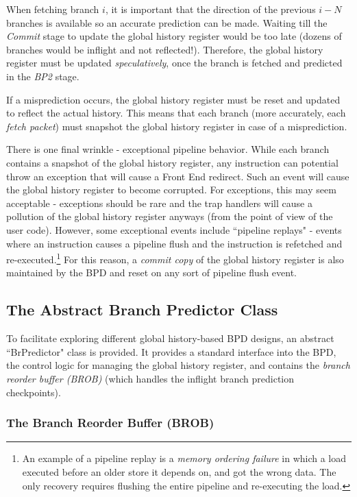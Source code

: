 When fetching branch $i$, it is important that the direction of the previous $i-N$ branches is available so an accurate prediction can be made.  Waiting till the {\em Commit} stage to update the global history register would be too late (dozens of branches would be inflight and not reflected!). Therefore, the global history register must be updated {\em speculatively}, once the branch is fetched and predicted in the {\em BP2} stage.

If a misprediction occurs, the global history register must be reset and updated to reflect the actual history.  This means that each branch (more accurately, each {\em fetch packet}) must snapshot the global history register in case of a misprediction.

There is one final wrinkle - exceptional pipeline behavior.  While each branch contains a snapshot of the global history register, any instruction can potential throw an exception that will cause a Front End redirect. Such an event will cause the global history register to become corrupted. For exceptions, this may seem acceptable - exceptions should be rare and the trap handlers will cause a pollution of the global history register anyways (from the point of view of the user code).  However, some exceptional events include ``pipeline replays" - events where an instruction causes a pipeline flush and the instruction is refetched and re-executed.\footnote{An example of a pipeline replay is a {\em memory ordering failure} in which a load executed before an older store it depends on, and got the wrong data. The only recovery requires flushing the entire pipeline and re-executing the load.}  For this reason, a {\em commit copy} of the global history register is also maintained by the BPD and reset on any sort of pipeline flush event.

\subsection{The Abstract Branch Predictor Class}

To facilitate exploring different global history-based BPD designs, an abstract ``BrPredictor" class is provided.  It provides a standard interface into the BPD, the control logic for managing the global history register, and contains the {\em branch reorder buffer (BROB)} (which handles the inflight branch prediction checkpoints).

\subsubsection{The Branch Reorder Buffer (BROB)}

